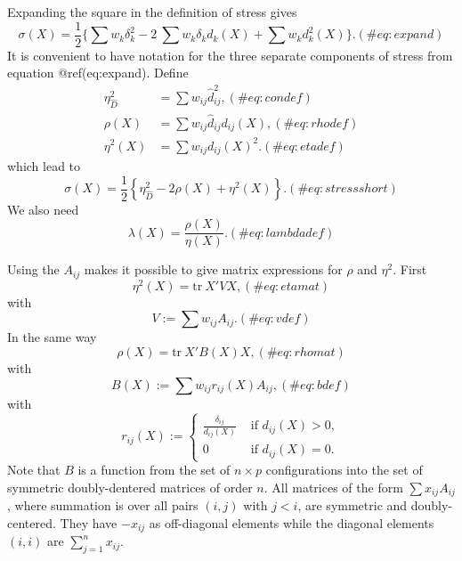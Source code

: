 \documentclass[
  12pt,
  letterpaper,
  DIV=11,
  numbers=noendperiod]{scrartcl}
\theoremstyle{plain}
\theoremstyle{remark}
\begin{document}
Expanding the square in the definition of stress gives \begin{equation}
\sigma(X)=\frac12\{\sum   w_k\delta_k^2-2\ \sum   w_k\delta_kd_k(X)+\sum   w_kd_k^2(X)\}.
(\#eq:expand)
\end{equation} It is convenient to have notation for the three separate
components of stress from equation @ref(eq:expand). Define \begin{align}
\eta_{\hat D}^2&=\sum   w_{ij}\hat d_{ij}^2,(\#eq:condef)\\
\rho(X)&=\sum   w_{ij}\hat d_{ij}d_{ij}(X),(\#eq:rhodef)\\
\eta^2(X)&=\sum   w_{ij}d_{ij}(X)^2.(\#eq:etadef)
\end{align} which lead to \begin{equation}
\sigma(X)=\frac12\left\{\eta_{\hat D}^2-2\rho(X)+\eta^2(X)\right\}.
(\#eq:stressshort)
\end{equation} We also need \begin{equation}
\lambda(X)=\frac{\rho(X)}{\eta(X)}.
(\#eq:lambdadef)
\end{equation}

Using the \(A_{ij}\) makes it possible to give matrix expressions for
\(\rho\) and \(\eta^2\). First \begin{equation}
\eta^2(X)=\text{tr}\ X'VX,
(\#eq:etamat)
\end{equation} with \begin{equation}
V:=\sum   w_{ij}A_{ij}.
(\#eq:vdef)
\end{equation} In the same way \begin{equation}
\rho(X)=\text{tr}\ X'B(X)X,
(\#eq:rhomat)
\end{equation} with \begin{equation}
B(X):=\sum   w_{ij}r_{ij}(X)A_{ij},
(\#eq:bdef)
\end{equation} with \begin{equation}
r_{ij}(X):=\begin{cases}\frac{\delta_{ij}}{d_{ij}(X)}&\text{ if }d_{ij}(X)>0,\\
0&\text{ if }d_{ij}(X)=0.
\end{cases}
\end{equation} Note that \(B\) is a function from the set of
\(n\times p\) configurations into the set of symmetric doubly-dentered
matrices of order \(n\). All matrices of the form \(\sum x_{ij}A_{ij}\),
where summation is over all pairs \((i,j)\) with \(j<i\), are symmetric
and doubly-centered. They have \(-x_{ij}\) as off-diagonal elements
while the diagonal elements \((i,i)\) are \(\sum_{j=1}^nx_{ij}\).
\end{document}
